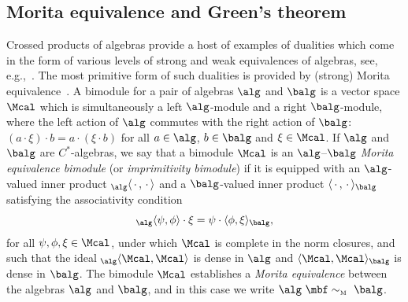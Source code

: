 \subsection{Morita equivalence and Green's theorem}\label{sec:Morita}

Crossed products of algebras provide a host of examples of dualities
which come in the form of various levels of strong and weak
equivalences of algebras, see, e.g.,~\cite{Brodzki2006}. The most
primitive form of such dualities is provided by (strong) Morita
equivalence~\cite{Rieffel1974}. A bimodule for a pair of algebras $\alg$ and $\balg$ is a
vector space $\Mcal$ which is simultaneously
 a left $\alg$-module and a right $\balg$-module, where the left action
 of $\alg$ commutes with the right action of $\balg$: $(a\cdot\xi)\cdot
 b=a\cdot (\xi\cdot b)$ for all $a\in \alg$, $b\in
 \balg$ and $\xi\in \Mcal$. If $\alg$ and $\balg$ are $C^*$-algebras,
 we say that a bimodule $\Mcal$ is an $\alg$--$\balg$ \emph{Morita
 equivalence bimodule} (or \emph{imprimitivity bimodule}) if it
is equipped with an $\alg$-valued inner product
${}_\alg\langle\,\cdot\,,\,\cdot\,\rangle$ and a $\balg$-valued inner
product $\langle\,\cdot\,,\,\cdot\,\rangle_\balg$ satisfying the
associativity condition
\[
{}_\alg\langle \psi,\phi\rangle \cdot \xi =
\psi\cdot\langle\phi,\xi\rangle_\balg ,
\]
for all $\psi,\phi,\xi\in\Mcal$, under which $\Mcal$ is complete in
the norm closures, and such that the ideal ${}_\alg\langle
\Mcal,\Mcal\rangle$ is dense in $\alg$ and $\langle
\Mcal,\Mcal\rangle_\balg$ is dense in $\balg$. The bimodule $\Mcal$ establishes a
\emph{Morita equivalence} between the algebras $\alg$ and $\balg$, and
in this case we write $\alg\ \mbf\sim_{\text{\tiny M}}\ \balg$.

